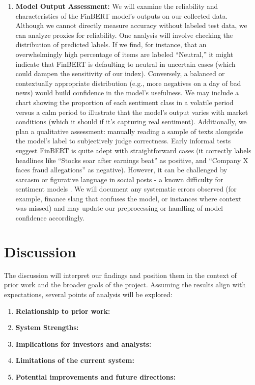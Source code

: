 \documentclass[12pt]{article}
\begin{document}
\begin{enumerate}
  \item \textbf{Model Output Assessment:} We will examine the reliability and characteristics of the FinBERT
        model's outputs on our collected data. Although we cannot directly measure accuracy without labeled
        test data, we can analyze proxies for reliability. One analysis will involve checking the
        distribution of predicted labels. If we find, for instance, that an overwhelmingly high percentage of
        items are labeled “Neutral,” it might indicate that FinBERT is defaulting to neutral in uncertain
        cases (which could dampen the sensitivity of our index). Conversely, a balanced or contextually
        appropriate distribution (e.g., more negatives on a day of bad news) would build confidence in the
        model's usefulness. We may include a chart showing the proportion of each sentiment class in a
        volatile period versus a calm period to illustrate that the model's output varies with market
        conditions (which it should if it's capturing real sentiment).\newline
        Additionally, we plan a qualitative assessment: manually reading a sample of texts alongside the
        model's label to subjectively judge correctness. Early informal tests suggest FinBERT is quite adept
        with straightforward cases (it correctly labels headlines like ``Stocks soar after earnings beat'' as
        positive, and ``Company X faces fraud allegations'' as negative). However, it can be challenged by
        sarcasm or figurative language in social posts - a known difficulty for sentiment models
        \cite{SentimentEmotionSurvey2021}. We will document any systematic errors observed (for example,
        finance slang that confuses the model, or instances where context was missed) and may update our
        preprocessing or handling of model confidence accordingly.
\end{enumerate}

\section{Discussion}
The discussion will interpret our findings and position them in the context of prior work and the broader
goals of the project. Assuming the results align with expectations, several points of analysis will be
explored:

\begin{enumerate}
  \item \textbf{Relationship to prior work:}
  \item \textbf{System Strengths:}
  \item \textbf{Implications for investors and analysts:}
  \item \textbf{Limitations of the current system:}
  \item \textbf{Potential improvements and future directions:}
\end{enumerate}
\end{document}

